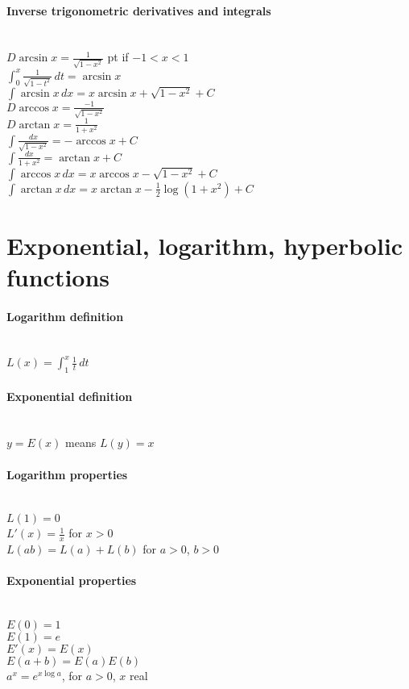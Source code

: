 \documentclass[10pt]{article}
\begin{document}
\paragraph{Inverse trigonometric derivatives and integrals}\ \\
$D \arcsin x = \frac{1}{\sqrt{1 - x^2}}$  pt if $-1 < x < 1$\\
$\int_0^x \frac{1}{\sqrt{1 - t^2}}\,dt = \arcsin x$\\
$\int \arcsin x\,dx = x \arcsin x + \sqrt{1 - x^2} + C$\\
$D \arccos x = \frac{-1}{\sqrt{1-x^2}}$\\
$D \arctan x = \frac{1}{1+x^2}$\\
$\int \frac{dx}{\sqrt{1-x^2}} = -\arccos x + C$\\
$\int \frac{dx}{1+x^2} = \arctan x + C$\\
$\int \arccos x\,dx = x \arccos x - \sqrt{1-x^2} + C$\\
$\int \arctan x\,dx = x \arctan x - \frac{1}{2} \log (1+x^2) + C$



\bigskip\bigskip
\section{Exponential, logarithm, hyperbolic functions}\smallskip

\paragraph{Logarithm definition}\ \\
$L(x) = \int_1^x \frac{1}{t}\,dt$

\paragraph{Exponential definition}\ \\
$y = E(x)$ means $L(y) = x$

\paragraph{Logarithm properties}\ \\
$L(1) = 0$\\
$L'(x) = \frac{1}{x}$ for ${x > 0}$\\
$L(ab) = L(a) + L(b)$ for $a > 0$, $b > 0$

\paragraph{Exponential properties}\ \\
$E(0) = 1$\\
$E(1) = e$\\
$E'(x) = E(x)$\\
$E(a+b) = E(a)E(b)$\\
$a^x = e^{x \log a}$, for $a > 0$, $x$ real
\end{document}
